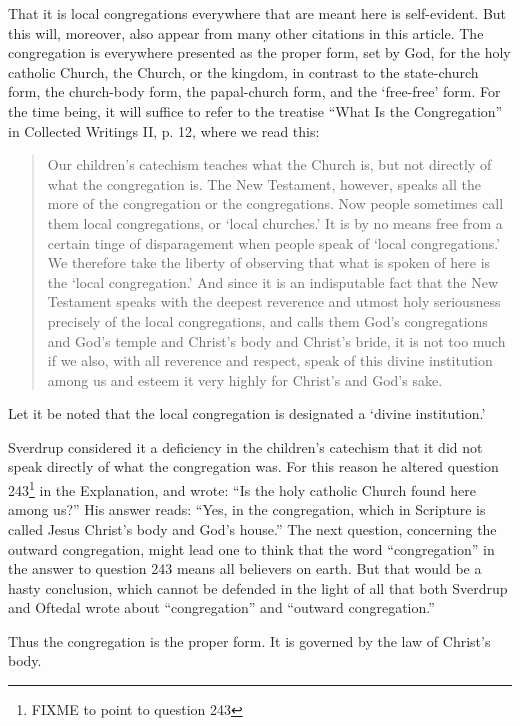 That it is local congregations everywhere that are meant here is self-evident. But this will, moreover, also appear from many other citations in this article. The congregation is everywhere presented as the proper form, set by God, for the holy catholic Church, the Church, or the kingdom, in contrast to the state-church form, the church-body form, the papal-church form, and the ‘free-free’ form. For the time being, it will suffice to refer to the treatise “What Is the Congregation” in Collected Writings II, p. 12, where we read this:

\begin{quote}
Our children’s catechism teaches what the Church is, but not directly of what the congregation is. The New Testament, however, speaks all the more of the congregation or the congregations. Now people sometimes call them local congregations, or ‘local churches.’ It is by no means free from a certain tinge of disparagement when people speak of ‘local congregations.’ We therefore take the liberty of observing that what is spoken of here is the ‘local congregation.’ And since it is an indisputable fact that the New Testament speaks with the deepest reverence and utmost holy seriousness precisely of the local congregations, and calls them God’s congregations and God’s temple and Christ’s body and Christ’s bride, it is not too much if we also, with all reverence and respect, speak of this divine institution among us and esteem it very highly for Christ’s and God’s sake.
\end{quote}


Let it be noted that the local congregation is designated a ‘divine institution.’

Sverdrup considered it a deficiency in the children’s catechism that it did not speak directly of what the congregation was. For this reason he altered question 243\footnote{FIXME to point to question 243} in the Explanation, and wrote: “Is the holy catholic Church found here among us?” His answer reads: “Yes, in the congregation, which in Scripture is called Jesus Christ’s body and God’s house.” The next question, concerning the outward congregation, might lead one to think that the word “congregation” in the answer to question 243 means all believers on earth. But that would be a hasty conclusion, which cannot be defended in the light of all that both Sverdrup and Oftedal wrote about “congregation” and “outward congregation.”

Thus the congregation is the proper form. It is governed by the law of Christ’s body. 

